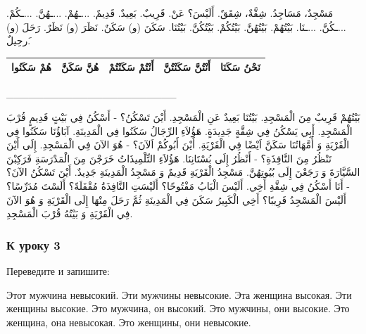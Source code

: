 \documentclass[a5paper]{article}
\begin{document}
مَسْجِدٌ، مَسَاجِدُ. شِقَّةٌ، شِقَقٌ. أَلَيْسَ؟ عَنْ. قَرِيبٌ. بَعِيدٌ. قَدِيمٌ. ...ـهُمْ. ...ـهُنَّ. ...ـكُمْ. ...ـكُنَّ. ...ـنَا. بَيْتُهُمْ. بَيْتُهُنَّ. بَيْتُكُمْ. بَيْتُكُنَّ. بَيْتُنَا. سَكَنَ (و) سَكَنٌ. نَظَرَ (و) نَظَرٌ. رَحَلَ (و) َرحِيلٌ.

\begin{center}
\tablefirsthead{}
\tablehead{}
\tabletail{}
\tablelasttail{}
\begin{supertabular}{|m{1.1712599in}|m{1.1712599in}|m{1.2962599in}|m{1.4212599in}|m{1.3170599in}|}
\hline
هُمْ سَكَنُوا &
هُنَّ سَكَنَّ &
أَنْتُمْ سَكَنْتُمْ &
أَنْتُنَّ سَكَنْتُنَّ &
نَحْنُ سَكَنَا\\\hline
\end{supertabular}
\end{center}
\_\_\_\_\_\_\_\_\_\_\_\_\_\_\_\_\_\_\_\_\_\_\_

بَيْتُهُمْ قَرِيبٌ مِنَ الْمَسْجِدِ. بَيْتُنَا بَعِيدٌ عَنِ الْمَسْجِدِ. أَيْنَ تَسْكُنُ؟ - أَسْكُنُ فِي بَيْتٍ قَدِيمٍ قُرْبَ الْمَسْجِدِ. أَبِي يَسْكُنُ فِي شِقَّةٍ جَدِيدَةٍ. هَؤُلاَءِ الرِّجَالُ سَكَنُوا فِي الْمَدِينَةِ. آبَاؤُنَا سَكَنُوا فِي الْقَرْيَةِ وَ أُمَّهَاتُنَا سَكَنَّ اَيْضًا فِي الْقَرْيَةِ. أَيْنَ أَبُوكُمْ اَلآنَ؟ - هُوَ الآنَ فِي الْمَسْجِدِ. إِلَى أَيْنَ تَنْظُرُ مِنَ النَّافِذَةِ؟ - أَنْظُرُ إِلَى بُسْتَانِنَا. هَؤُلاَءِ التِّلْمِيذَاتُ خَرَجْنَ مِنَ الْمَدْرَسَةِ فَرَكِبْنَ السَّيَّارَةَ وَ رَجَعْنَ إِلَى بُيُوتِهُنَّ. مَسْجِدُ الْقَرْيَةِ قَدِيمٌ وَ مَسْجِدُ الْمَدِينَةِ جَدِيدٌ. أَيْنَ تَسْكُنُ الآنَ؟ - أَنَا أَسْكُنُ فِي شِقَّةِ أَخِي. أَلَيْسَ الْبَابُ مَفْتُوحًا؟ أَلَيْسَتِ النَّافِذَةُ مُقْفَلَةً؟ أَلَسْتَ مُدَرِّسًا؟ أَلَيْسَ الْمَسْجِدُ قَرِيبًا؟ أَخِي الْكَبِيرُ سَكَنَ فِي الْمَدِينَةِ ثُمَّ رَحَلَ مِنْهَا إِلَى الْقَرْيَةِ وَ هُوَ الآنَ فِي الْقَرْيَةِ وَ بَيْتُهُ قُرْبَ الْمَسْجِدِ.

\subsubsection[К уроку 3]{К уроку 3}
Переведите и запишите:

Этот мужчина невысокий. Эти мужчины невысокие. Эта женщина высокая. Эти женщины высокие. Это мужчина, он высокий. Это мужчины, они высокие. Это женщина, она невысокая. Это женщины, они невысокие.
\end{document}
